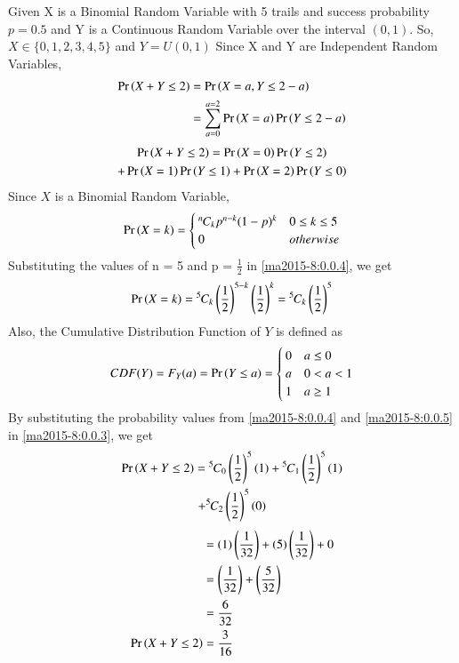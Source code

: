 Given X is a Binomial Random Variable with 5 trails and success probability $p=0.5$ and Y is a Continuous Random Variable over the interval $(0,1)$.
So, $X \in \{0,1,2,3,4,5\}$ and $Y = U(0,1)$
Since X and Y are Independent Random Variables,
\begin{align}
\Pr\left(X + Y \leq 2\right) &= \Pr\left(X = a, Y \leq 2-a\right) \\
&= \sum_{a = 0}^{a = 2} \Pr\left(X = a\right)\Pr\left(Y \leq 2-a\right) 
\end{align}
\begin{multline}
\Pr\left(X + Y \leq 2\right) = \Pr\left(X = 0\right)\Pr\left(Y \leq 2\right) \label{ma2015-8:0.0.3} \\ 
+ \Pr\left(X = 1\right)\Pr\left(Y \leq 1\right) + \Pr\left(X = 2\right)\Pr\left(Y \leq 0\right)    
\end{multline}
Since $X$ is a Binomial Random Variable,
\begin{align}
\Pr\left(X = k\right) = \begin{cases}
{{}^{n}\mkern-1muC_{k}}p^{n-k}(1-p)^{k} & 0 \leq k \leq 5 \\
0 & otherwise
\end{cases} \label{ma2015-8:0.0.4}
\end{align}
Substituting the values of n = 5 and p = $\frac{1}{2}$ in \eqref{ma2015-8:0.0.4}, we get
\begin{align*}
\Pr\left(X = k\right) = {{}^{5}\mkern-1muC_{k}} \left(\frac{1}{2} \right)^{5-k} \left(\frac{1}{2} \right)^{k} = {{}^{5}\mkern-1muC_{k}} \left(\frac{1}{2} \right)^{5}    
\end{align*}
Also, the Cumulative Distribution Function of $Y$ is
defined as
\begin{align}
CDF(Y) = F_Y(a) = \Pr\left(Y \leq a\right) = \begin{cases}
0 & a \leq 0 \\
a & 0 < a < 1 \\ 
1 & a \geq 1
\end{cases} \label{ma2015-8:0.0.5}   
\end{align}
By substituting the probability values from \eqref{ma2015-8:0.0.4} and \eqref{ma2015-8:0.0.5} in \eqref{ma2015-8:0.0.3}, we get
\begin{multline}
\Pr\left(X + Y \leq 2\right) = {{}^{5}\mkern-1muC_{0}} \left(\frac{1}{2} \right)^{5}(1) + {{}^{5}\mkern-1muC_{1}} \left(\frac{1}{2} \right)^{5}(1) \\ + {{}^{5}\mkern-1muC_{2}} \left(\frac{1}{2} \right)^{5}(0)    
\end{multline}
\begin{align}
&= (1)\left(\frac{1}{32} \right) + (5)\left(\frac{1}{32} \right) + 0 \\
&= \left(\frac{1}{32} \right) + \left(\frac{5}{32} \right) \\
&= \frac{6}{32} \\
\Pr\left(X + Y \leq 2\right) &= \frac{3}{16}    
\end{align}
